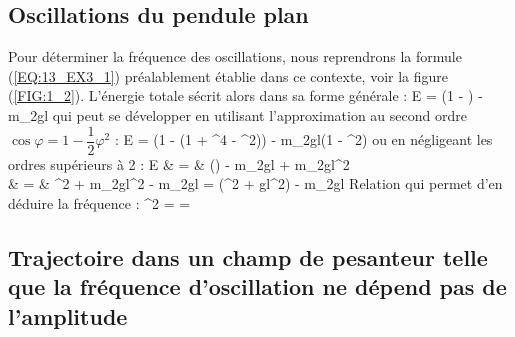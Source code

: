 \subsection{Oscillations du pendule plan}

Pour d\'eterminer la fr\'equence des oscillations, nous reprendrons la formule (\ref{EQ:13_EX3_1}) pr\'ealablement \'etablie dans ce contexte, voir la figure (\ref{FIG:1_2}). L'\'energie totale s\'ecrit alors dans sa forme g\'en\'erale :
\be
	E = \left(1 - \right) - m_{2}gl\cos\varphi
\ee
qui peut se d\'evelopper en utilisant l'approximation au second ordre $\cos\varphi = 1 - \dfrac{1}{2}\varphi^{2}$ :
\be
	E = \left(1 - (1 + \varphi^{4} - \varphi^{2})\right) - m_{2}gl(1 - \varphi^{2})
\ee
ou en n\'egligeant les ordres sup\'erieurs \`a 2 :
\bea
	E & = & \left(\right) - m_{2}gl + m_{2}gl\varphi^{2} \nonumber \\
	& = & \dot{\varphi}^{2} + m_{2}gl\varphi^{2} - m_{2}gl = \left(\dot{\varphi}^{2} + gl\varphi^{2}\right) - m_{2}gl
\eea
Relation qui permet d'en d\'eduire la fr\'equence :
\be
	\omega^{2} =  = 
\ee

\subsection{Trajectoire dans un champ de pesanteur telle que la fr\'equence d'oscillation ne d\'epend pas de l'amplitude}

